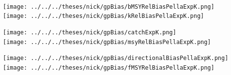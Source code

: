 \documentclass[ xcolor = pdftex, dvipsnames, table ]{beamer}
\begin{document}
%
\begin{frame}%
$~$
\hspace*{-1.25cm}
\begin{minipage}[h!]{0.33\textwidth}
\hspace*{0.25cm}
\texttt{[image: ../../../theses/nick/gpBias/bMSYRelBiasPellaExpK.png]}\\
\hspace*{0.25cm}
\texttt{[image: ../../../theses/nick/gpBias/kRelBiasPellaExpK.png]}
\end{minipage}
\begin{minipage}[h!]{0.33\textwidth}
\hspace*{0.75cm}
\texttt{[image: ../../../theses/nick/gpBias/catchExpK.png]}\\
\hspace*{0.75cm}
\texttt{[image: ../../../theses/nick/gpBias/msyRelBiasPellaExpK.png]}
\end{minipage}
\begin{minipage}[h!]{0.33\textwidth}
\hspace*{1cm}
\texttt{[image: ../../../theses/nick/gpBias/directionalBiasPellaExpK.png]}\\
\hspace*{1cm}
\texttt{[image: ../../../theses/nick/gpBias/fMSYRelBiasPellaExpK.png]}
\end{minipage}
\end{frame}
\end{document}
